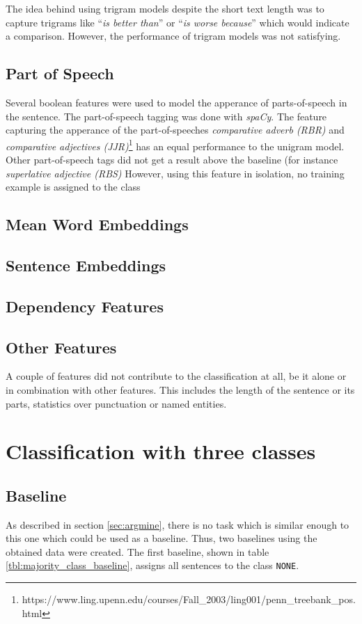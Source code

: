 The idea behind using trigram models despite the short text length was to capture trigrams like \enquote{\emph{is better than}} or \enquote{\emph{is worse because}} which would indicate a comparison. However, the performance of trigram models was not satisfying.
\label{sec:ngrams}

\subsection{Part of Speech}
Several boolean features were used to model the apperance of parts-of-speech in the sentence. The part-of-speech tagging was done with \emph{spaCy}. The feature capturing the apperance of the part-of-speeches \emph{comparative adverb (RBR)} and \emph{comparative adjectives (JJR)}\footnote{https://www.ling.upenn.edu/courses/Fall\_2003/ling001/penn\_treebank\_pos.html} has an equal performance to the unigram model. Other part-of-speech tags did not get a result above the baseline (for instance \emph{superlative adjective (RBS)} However, using this feature in isolation, no training example is assigned to the class

\subsection{Mean Word Embeddings}

\subsection{Sentence Embeddings}
\subsection{Dependency Features}
\subsection{Other Features}
A couple of features did not contribute to the classification at all, be it alone or in combination with other features. This includes the length of the sentence or its parts, statistics over punctuation or named entities.

\section{Classification with three classes}
\subsection{Baseline}
\label{sec:baseline}
As described in section \ref{sec:argmine}, there is no task which is similar enough to this one which could be used as a baseline. Thus, two baselines using the obtained data were created. The first baseline, shown in table \ref{tbl:majority_class_baseline}, assigns all sentences to the class \texttt{NONE}.



